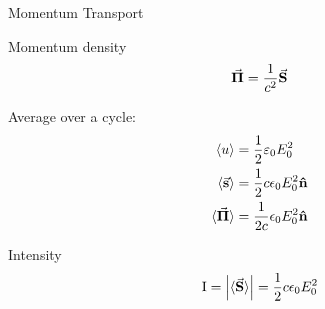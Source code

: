 \documentclass{beamer}
\begin{document}



\begin{frame}{Momentum Transport}

    \begin{block}{Momentum density}
        \begin{equation}
        \va{\Pi} = \frac{1}{c^2}\va{S}
    \end{equation}
    \end{block}

    Average over a cycle:
    \begin{equation}
        \begin{split}
            \langle u\rangle&=\frac{1}{2} \varepsilon_{0} E_{0}^{2} \\
            \langle \va{s} \rangle &= \frac{1}{2}c\epsilon_0E^2_0 \vu{n} \\ 
            \langle \va{\Pi} \rangle&= \frac{1}{2c}\epsilon_0 E^2_0 \vu{n}
        \end{split}
    \end{equation}

    \begin{block}{Intensity}
        \begin{equation}
            \text{I} = \abs{\langle \va{S} \rangle} = \frac{1}{2} c \epsilon_0 E^2_0
        \end{equation}        
    \end{block}

\end{frame}
\end{document}
